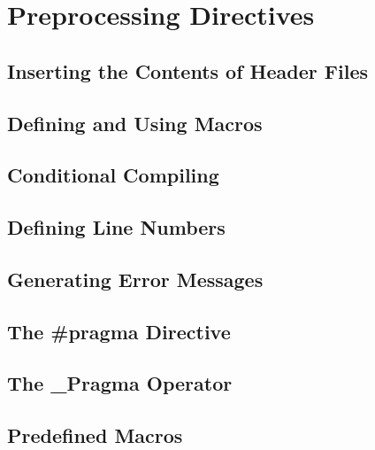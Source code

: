 \section{Preprocessing Directives}

\subsection{Inserting the Contents of Header Files}
\subsection{Defining and Using Macros}
\subsection{Conditional Compiling}
\subsection{Defining Line Numbers}
\subsection{Generating Error Messages}
\subsection{The \#pragma Directive}
\subsection{The \_Pragma Operator}
\subsection{Predefined Macros}